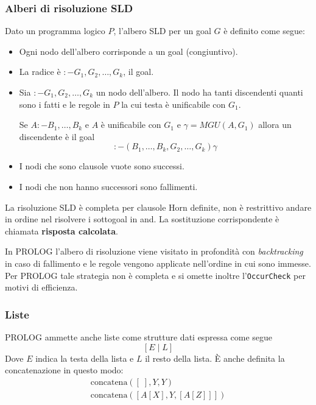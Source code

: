 \subsubsection{Alberi di risoluzione SLD}
Dato un programma logico $P$, l'albero SLD per un goal $G$ \`e definito come segue:
\begin{itemize}
	\item Ogni nodo dell'albero corrisponde a un goal (congiuntivo).
	\item La radice \`e $:- G_1, G_2, \dots, G_k$, il goal.
	\item Sia $:- G_1, G_2, \dots, G_k$ un nodo dell'albero. Il nodo ha tanti discendenti quanti sono i fatti e le
	      regole in $P$ la cui testa \`e unificabile con $G_1$.

	      Se $A :- B_1, \dots, B_k$ e $A$ \`e unificabile con $G_1$ e $\gamma = MGU(A, G_1)$ allora un discendente \`e
	      il goal
	      \[ :- (B_1, \dots, B_k, G_2, \dots, G_k) \gamma \]
	\item I nodi che sono clausole vuote sono successi.
	\item I nodi che non hanno successori sono fallimenti.
\end{itemize}
La risoluzione SLD \`e completa per clausole Horn definite, non \`e restrittivo andare in ordine nel risolvere i sottogoal
in and. La sostituzione corrispondente \`e chiamata \textbf{risposta calcolata}.

In PROLOG l'albero di risoluzione viene visitato in profondit\`a con \emph{backtracking} in caso di fallimento e le
regole vengono applicate nell'ordine in cui sono immesse. Per PROLOG tale strategia non \`e completa e si omette inoltre
l'\verb|OccurCheck| per motivi di efficienza.

\subsubsection{Liste}
PROLOG ammette anche liste come strutture dati espressa come segue
\[ [E \mid L] \]
Dove $E$ indica la testa della lista e $L$ il resto della lista. \`E anche definita la concatenazione in questo modo:
\[
	\begin{array}{ll}
		\text{concatena}([\;], Y, Y) \\
		\text{concatena}([A[X], Y, [A[Z]]])
	\end{array}
\]